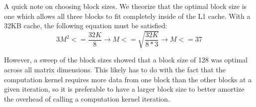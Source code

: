A quick note on choosing block sizes. We theorize that the optimal block
size is one which allows all three blocks to fit completely inside of the
L1 cache. With a 32KB cache, the following equation must be satisfied:
\[
3M^2 <= \frac{32K}{8} \rightarrow M <= \sqrt{\frac{32K}{8*3}} \rightarrow M <= 37
\]
\smallskip

However, a sweep of the block sizes showed that a block size of 128 was
optimal across all matrix dimensions. This likely has to do with the fact
that the computation kernel requires more data from one block than the
other blocks at a given iteration, so it is preferable to have a larger
block size to better amortize the overhead of calling a computation
kernel iteration.

\clearpage
